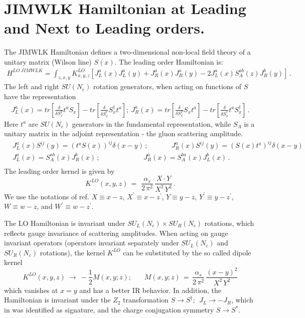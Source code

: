\documentclass[11pt,a4paper]{article}
\def\beq{\begin{equation}}
\def\eeq{\end{equation}}
\def\beq{\begin{equation}}
\def\eeq{\end{equation}}
\begin{document}
\section{JIMWLK Hamiltonian at Leading and Next to Leading orders.}
The JIMWLK Hamiltonian defines a two-dimensional non-local field theory of a  unitary matrix (Wilson line) $S(x)$. 
The leading order  Hamiltonian is:
\begin{eqnarray}\label{LO}
H^{LO\ JIMWLK}= \int _{z,x,y} K^{LO}_{x,y,z} \left[ J^a_L(x)J^a_L(y)+J_R^a(x)J_R^a(y)- 2J_L^a(x)S^{ab}_A(z)J^b_R(y)\right]\,.
\end{eqnarray}
The left and right $SU(N_c)$ rotation generators, when acting on functions of $S$ have the representation
\begin{eqnarray}\label{LR}
J^a_L(x)=tr\left[\frac{\delta}{\delta S^{T}_x}t^aS_x\right]-tr\left[\frac{\delta}{\delta S^{*}_x}S^\dagger_xt^a\right] ; \ 
J^a_R(x)=tr\left[\frac{\delta}{\delta S^{T}_x}S_xt^a\right] -tr\left[\frac{\delta}{\delta S^{*}_x}t^aS^\dagger_x\right]\,.
\end{eqnarray}
Here $t^a$ are $SU(N_c)$ generators in the fundamental representation, while $S_A$ is a unitary matrix in the adjoint representation - the gluon scattering amplitude. 
\begin{equation}\begin{split}
&J_{L}^{a}(x)S^{ij}(y)=(t^aS(x))^{ij}\delta(x-y)\,; \ \ \ \ \ \ \ \  \ \ \ \ \ \ \ J_{R}^{a}(x)S^{ij}(y)=(S(x)t^a)^{ij}\delta(x-y)\\
&J_{L}^{a}(x)=S_{A}^{ab}(x)J_{R}^{b}(x)\,; \ \ \ \ \ \ \ \  \ \ \ \ \ \ \  \ \ \ \  \ \ \ \ \ \ \ \ \ J_{R}^{a}(x)=S_{A}^{ba}(x)J_{L}^{b}(x)\,. \\
 \end{split}\end{equation}
The leading order kernel  is given by
\beq
K^{LO}(x,y,z)\,=\,\,\frac{\alpha_s}{2\,\pi^2}\,\frac{X\cdot Y}{ X^2\,Y^2}\,.
\eeq
We use the notations of ref. \cite{BC} $X\equiv x-z$,  $X^\prime\equiv x-z^\prime$, $Y\equiv y-z$,    $ Y^\prime \equiv y-z^\prime$,
$W\equiv w-z$,  and  $ W^\prime \equiv w-z^\prime$.

The LO Hamiltonian is invariant under $SU_L(N_c)\times SU_R(N_c)$ rotations, which reflects gauge invariance of scattering amplitudes.
When acting on gauge invariant operators (operators invariant separately under $SU_L(N_c)$ and $SU_R(N_c)$ rotations), the kernel $K^{LO}$ can be 
substituted by the so called dipole kernel
\begin{equation}
K^{LO}(x,y,z)\ \rightarrow \ - \frac{1}{2}M(x,y;z); \ \ \ \ \ \ \ \ M(x,y;z)\,=\,\frac{\alpha_s}{2\,\pi^2}\,\frac{(x-y)^2}{X^2\,Y^2}
\end{equation}
which vanishes at $x=y$ and has a better IR behavior. In addition, the Hamiltonian is invariant under the $Z_2$ transformation $S\rightarrow S^\dagger; \ \ J_L\rightarrow -J_R$, which in \cite{reggeon} was identified as signature, and the charge conjugation symmetry $S\rightarrow S^*$.
\end{document}
